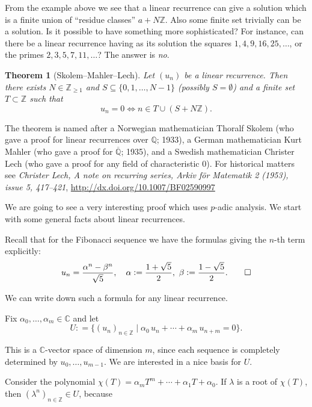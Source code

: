 \documentclass{article}
\newcommand{\dfn}{\mathrel{\mathop:}=}
\newcommand{\ZZ}{\mathbb{Z}}
\newcommand{\QQ}{\mathbb{Q}}
\newcommand{\examplesymbol}{$\blacktriangle$}
\renewcommand{\qedsymbol}{$\blacksquare$}
\theoremstyle{myplain}
\newtheorem{theorem}[proposition]{Theorem}
\theoremstyle{mydefinition}
\newenvironment{example}
  {\pushQED{\qed}\renewcommand{\qedsymbol}{\examplesymbol}\examplex}
  {\popQED\endexamplex}
\begin{document}
From the example above we see that a linear recurrence can give a solution which
is a finite union of ``residue classes'' $a + N \ZZ$. Also some finite set
trivially can be a solution. Is it possible to have something more
sophisticated? For instance, can there be a linear recurrence having as its
solution the squares $1, 4, 9, 16, 25, \ldots$, or the primes
$2, 3, 5, 7, 11, \ldots$? The answer is \emph{no}.

\begin{theorem}[Skolem--Mahler--Lech]
  Let $(u_n)$ be a linear recurrence. Then there exists $N \in \ZZ_{\ge 1}$ and
  $S \subseteq \{ 0, 1, \ldots, N-1 \}$ (possibly $S = \emptyset$) and a finite
  set $T \subset \ZZ$ such that
  $$u_n = 0 \iff n\in T \cup (S + N \ZZ).$$
\end{theorem}

The theorem is named after a Norwegian mathematician Thoralf Skolem (who gave a
proof for linear recurrences over $\QQ$; 1933), a German mathematician Kurt
Mahler (who gave a proof for $\overline{\QQ}$; 1935), and a Swedish
mathematician Christer Lech (who gave a proof for any field of characteristic
$0$). For historical matters see \emph{Christer Lech, A note on recurring
  series, Arkiv f\"or Matematik 2 (1953), issue 5, 417--421},
\url{http://dx.doi.org/10.1007/BF02590997}

We are going to see a very interesting proof which uses $p$-adic analysis.
We start with some general facts about linear recurrences.

\begin{example}
  Recall that for the Fibonacci sequence we have the formulas giving the $n$-th
  term explicitly:
  \[ u_n = \frac{\alpha^n - \beta^n}{\sqrt{5}}, \quad
    \alpha \dfn \frac{1 + \sqrt{5}}{2}, ~
    \beta \dfn \frac{1 - \sqrt{5}}{2}. \qedhere \]
\end{example}

We can write down such a formula for any linear recurrence.

\vspace{1em}

Fix $\alpha_0, \ldots, \alpha_m \in \mathbb{C}$ and let
$$U \dfn \{ (u_n)_{n \in \ZZ} \mid \alpha_0 \, u_n + \cdots + \alpha_m \, u_{n+m} = 0 \}.$$

This is a $\mathbb{C}$-vector space of dimension $m$, since each sequence is
completely determined by $u_0, \ldots, u_{m-1}$. We are interested in a nice
basis for $U$.

Consider the polynomial
$\chi (T) = \alpha_m T^m + \cdots + \alpha_1 T + \alpha_0$. If $\lambda$ is a
root of $\chi (T)$, then $(\lambda^n)_{n\in \ZZ} \in U$, because
\end{document}
